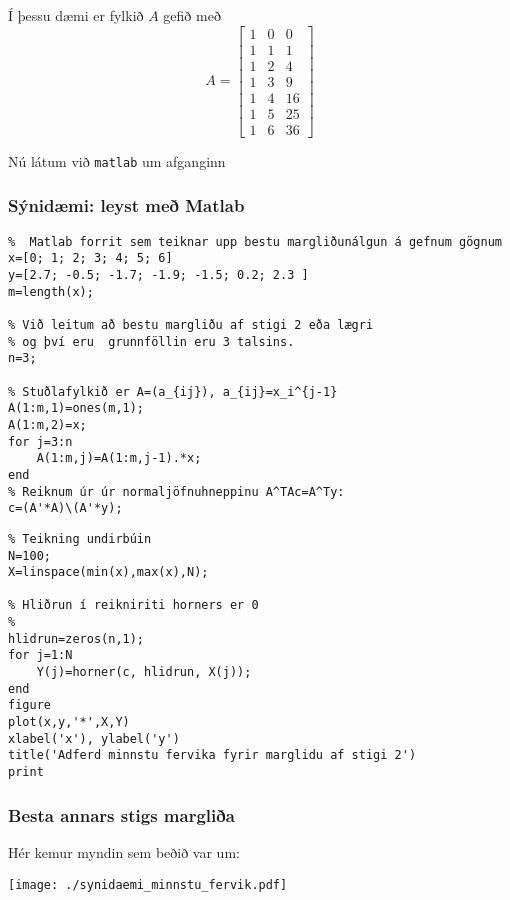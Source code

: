 \documentclass[icelandic,a4paper,12pt]{article}
\begin{document}
Í þessu dæmi er fylkið $A$ gefið með
$$
A=\left[\begin{matrix}
1 & 0&0\\
1 & 1&1\\
1&2&4\\
1&3&9\\
1&4&16\\
1&5&25\\
1&6&36
\end{matrix}\right]
$$

Nú látum við {\tt matlab} um afganginn


\subsubsection{Sýnidæmi:  leyst með Matlab}
\begin{verbatim}
%  Matlab forrit sem teiknar upp bestu margliðunálgun á gefnum gögnum
x=[0; 1; 2; 3; 4; 5; 6] 
y=[2.7; -0.5; -1.7; -1.9; -1.5; 0.2; 2.3 ] 
m=length(x); 

% Við leitum að bestu margliðu af stigi 2 eða lægri 
% og því eru  grunnföllin eru 3 talsins. 
n=3; 

% Stuðlafylkið er A=(a_{ij}), a_{ij}=x_i^{j-1}  
A(1:m,1)=ones(m,1); 
A(1:m,2)=x; 
for j=3:n 
    A(1:m,j)=A(1:m,j-1).*x; 
end  
% Reiknum úr úr normaljöfnuhneppinu A^TAc=A^Ty:  
c=(A'*A)\(A'*y); 
\end{verbatim}


\begin{verbatim}
% Teikning undirbúin 
N=100;   
X=linspace(min(x),max(x),N); 

% Hliðrun í reikniriti horners er 0 
% 
hlidrun=zeros(n,1); 
for j=1:N 
    Y(j)=horner(c, hlidrun, X(j)); 
end 
figure 
plot(x,y,'*',X,Y) 
xlabel('x'), ylabel('y') 
title('Adferd minnstu fervika fyrir marglidu af stigi 2') 
print 
\end{verbatim}


\subsubsection{Besta annars stigs margliða} 
Hér kemur myndin sem beðið var um:
\begin{center}
 \texttt{[image: ./synidaemi\_minnstu\_fervik.pdf]}
 \end{center}
\end{document}
